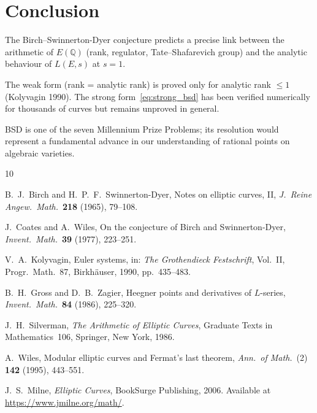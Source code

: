 \documentclass[12pt,a4paper]{amsart}
\theoremstyle{definition}
\newcommand{\Q}{\mathbb{Q}}
\begin{document}
\section{Conclusion}

The Birch--Swinnerton-Dyer conjecture predicts a precise link between the
arithmetic of $E(\Q)$ (rank, regulator, Tate--Shafarevich group) and the
analytic behaviour of $L(E,s)$ at $s=1$.

The weak form (rank = analytic rank) is proved only for analytic rank $\le 1$
(Kolyvagin 1990).  The strong form~\eqref{eq:strong_bsd} has been verified
numerically for thousands of curves but remains unproved in general.

BSD is one of the seven Millennium Prize Problems; its resolution would
represent a fundamental advance in our understanding of rational points
on algebraic varieties.

\begin{thebibliography}{10}

B.~J.~Birch and H.~P.~F.~Swinnerton-Dyer,
Notes on elliptic curves, II,
\emph{J.\ Reine Angew.\ Math.}\ \textbf{218} (1965), 79--108.

J.~Coates and A.~Wiles,
On the conjecture of Birch and Swinnerton-Dyer,
\emph{Invent.\ Math.}\ \textbf{39} (1977), 223--251.

V.~A.~Kolyvagin,
Euler systems,
in: \emph{The Grothendieck Festschrift}, Vol.~II,
Progr.\ Math.~87, Birkh\"auser, 1990, pp.~435--483.

B.~H.~Gross and D.~B.~Zagier,
Heegner points and derivatives of $L$-series,
\emph{Invent.\ Math.}\ \textbf{84} (1986), 225--320.

J.~H.~Silverman,
\emph{The Arithmetic of Elliptic Curves},
Graduate Texts in Mathematics~106,
Springer, New York, 1986.

A.~Wiles,
Modular elliptic curves and Fermat's last theorem,
\emph{Ann.\ of Math.}\ (2) \textbf{142} (1995), 443--551.

J.~S.~Milne,
\emph{Elliptic Curves},
BookSurge Publishing, 2006.
Available at \url{https://www.jmilne.org/math/}.

\end{thebibliography}
\end{document}
